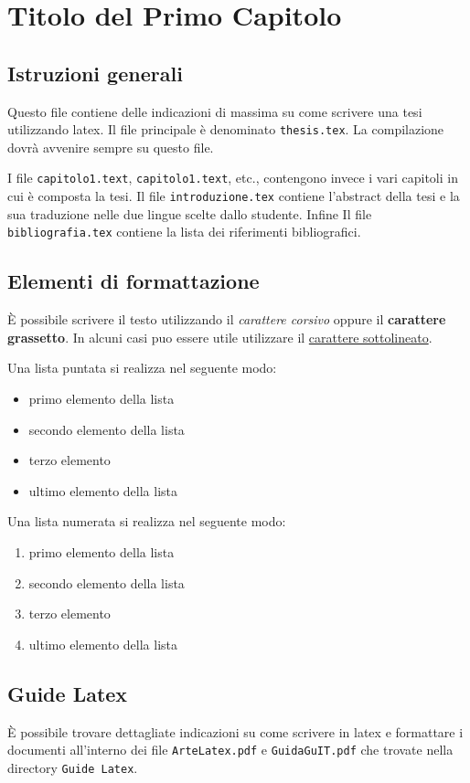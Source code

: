 \chapter{Titolo del Primo Capitolo}
\vspace{4cm}

\section{Istruzioni generali}
Questo file contiene delle indicazioni di massima su come scrivere una tesi utilizzando latex.
Il file principale \`e denominato \texttt{thesis.tex}. La compilazione dovr\`a avvenire sempre su questo file.

I file \texttt{capitolo1.text}, \texttt{capitolo1.text}, etc., contengono invece i vari capitoli in cui \`e composta la tesi.
Il file \texttt{introduzione.tex} contiene l'abstract della tesi e la sua traduzione nelle due lingue scelte dallo studente. Infine Il file \texttt{bibliografia.tex} contiene la lista dei riferimenti bibliografici.

\section{Elementi di formattazione}
\`E possibile scrivere il testo utilizzando il \emph{carattere corsivo} oppure il \textbf{carattere grassetto}.
In alcuni casi puo essere utile utilizzare il \underline{carattere sottolineato}.

Una lista puntata si realizza nel seguente modo:
\begin{itemize}
	\item primo elemento della lista
	\item secondo elemento della lista
	\item terzo elemento
	\item ultimo elemento della lista
\end{itemize}

Una lista numerata si realizza nel seguente modo:
\begin{enumerate}
	\item primo elemento della lista
	\item secondo elemento della lista
	\item terzo elemento
	\item ultimo elemento della lista
\end{enumerate}

\section{Guide Latex}
\`E possibile trovare dettagliate indicazioni su come scrivere in latex e formattare i documenti all'interno dei file \texttt{ArteLatex.pdf} e \texttt{GuidaGuIT.pdf} che trovate nella directory \texttt{Guide Latex}.